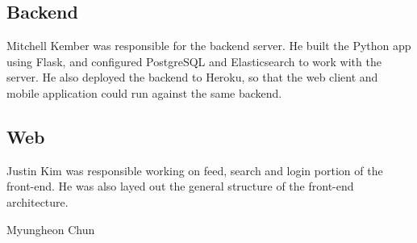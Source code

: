 \documentclass[12pt]{article}
\begin{document}
    \subsection{Backend}
      Mitchell Kember was responsible for the backend server. He built the
      Python app using Flask, and configured PostgreSQL and Elasticsearch to
      work with the server. He also deployed the backend to Heroku, so that the
      web client and mobile application could run against the same backend.
    \subsection{Web}
      Justin Kim was responsible working on feed, search and login portion of the front-end. He was also layed out the general structure
      of the front-end architecture. 

      
      Myungheon Chun
    
\end{document}
